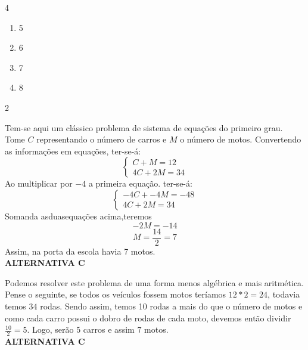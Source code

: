         \begin{multicols}{4}
                \begin{enumerate}[label=\alph*)]
                    \item 5
                    \item 6
                    \item 7
                    \item 8
                \end{enumerate}
            \end{multicols}

\begin{solucoes}{2}

\solucao
    Tem-se aqui um clássico problema de sistema de equações do primeiro grau. Tome $C$ representando o número de carros e $M$ o número de motos. Convertendo as informações em equações, ter-se-á:
        \begin{equation*}
\begin{cases}
  C+M=12\\
     4C+2M=34 
\end{cases}
 \end{equation*}
    Ao multiplicar por $-4$ a primeira equação. ter-se-á:
        \begin{equation*}
\begin{cases}
    -4C+-4M=-48\\
     4C+2M=34 
\end{cases}
 \end{equation*}   
Somanda asduasequações acima,teremos
\begin{equation*}
    -2M=-14
\end{equation*} 
\begin{equation*}
    M=\frac{14}{2}=7
\end{equation*}
Assim, na porta da escola havia 7 motos.\\
\textbf{ALTERNATIVA C}

\solucao

Podemos resolver este problema de uma forma menos algébrica e mais aritmética. Pense o seguinte, se todos os veículos fossem motos teríamos $12*2=24$, todavia temos $34$ rodas. Sendo assim, temos 10 rodas a mais do que o número de motos e como cada carro possui o dobro de rodas de cada moto, devemos então dividir $\frac{10}{2}=5$. Logo, serão $5$ carros e assim $7$ motos.  \\
\textbf{ALTERNATIVA C}

\end{solucoes}


